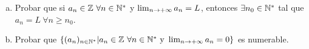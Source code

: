 
\hfill

\begin{enumerate}[a)]
	\item Probar que si $a_n\in\mathbb{Z}\ \forall n\in\mathbb{N}^*$ y $\limite{n}{a_n}=L$, entonces $\exists n_0\in\mathbb{N}^*$ tal que $a_n=L\ \forall n\geq n_0$.
	\item Probar que $\set{(a_n)_{n\in\N}|a_n\in\Z\ \forall n\in\N \text{ y } \limite{n}{a_n}=0}$ es numerable.
\end{enumerate}